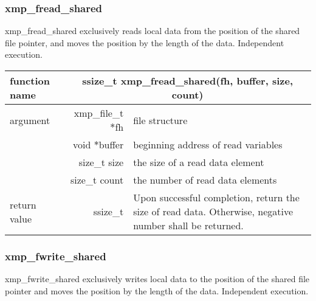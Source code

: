    \subsubsection{xmp\_fread\_shared}

   xmp\_fread\_shared exclusively reads local data from the position of
   the shared file pointer, and moves the position by the length of the data.
   Independent execution.

   \begin{table}[h]
    \begin{center}
     \begin{tabular}{|l|r|p{80mm}|}
      \hline
      {\bf function name}  & \multicolumn{2}{c|}{\bf ssize\_t
      xmp\_fread\_shared(fh, buffer, size, count)}  \\ \hline \hline
      argument & xmp\_file\_t $*$fh & file structure \\ \cline{2-3}
      & void $*$buffer & beginning address of read variables \\ \cline{2-3}
      & size\_t size & the size of a read data element \\ \cline{2-3}
      & size\_t count & the number of read data elements \\ \hline
      return value & ssize\_t & Upon successful completion, return the size
	      of read data. Otherwise, negative number shall be
	      returned. \\ \hline
      \end{tabular}
     \end{center}
    \label{tb:aaa}
   \end{table}

   \subsubsection{xmp\_fwrite\_shared}
   xmp\_fwrite\_shared exclusively writes local data to the
   position of the shared file pointer and moves the position by the length of the data.
   Independent execution.

